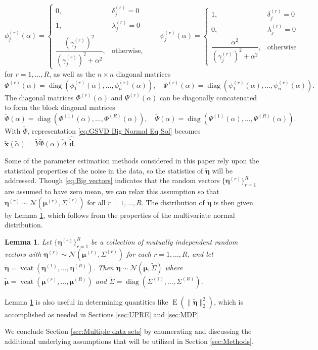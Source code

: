 \documentclass[12pt]{article}
\newcommand{\dVec}{\mathbf{d}}	%
\newcommand{\xVec}{\mathbf{x}}	%
\newcommand{\pinv}[1]{{#1}^\dagger}	%
\DeclareMathOperator{\diag}{diag}	%
\DeclareMathOperator{\vcat}{vcat}	%
\newcommand{\regparam}{\alpha}  %
\newcommand{\regparamBig}{\widetilde{\regparam}}   %
\newcommand{\xBig}{\widetilde{\xVec}}	%
\newcommand{\dBig}{\widetilde{\dVec}}	%
\newcommand{\filt}{\phi}
\newcommand{\mfilt}{\psi}
\newcommand{\noise}{\eta}	%
\newcommand{\noiseVec}{\bm{\noise}}	%
\DeclareMathOperator{\E}{E}	%
\newcommand{\svd}[1]{\widehat{#1}}	%
\newtheorem{lemma}{Lemma}[section]
\begin{document}
\[\filt_j^{(r)}\left(\regparam\right) = \begin{cases}
0, & \delta_j^{(r)} = 0 \\
1, & \lambda_j^{(r)} = 0 \\
\dfrac{\left(\gamma_j^{(r)}\right)^2}{\left(\gamma_j^{(r)}\right)^2 + \regparam^2}, & \text{otherwise,}
\end{cases} \qquad
\mfilt_j^{(r)}\left(\regparam\right) = \begin{cases}
1, & \delta_j^{(r)} = 0 \\
0, & \lambda_j^{(r)} = 0 \\
\dfrac{\regparam^2}{\left(\gamma_j^{(r)}\right)^2 + \regparam^2}, & \text{otherwise}
\end{cases}\]
for $r = 1,\ldots,R$, as well as the $n \times n$ diagonal matrices
\[\Phi^{(r)}(\regparam) = \diag\left(\filt_1^{(r)}(\regparam),\ldots,\filt_n^{(r)}(\regparam)\right), \quad \Psi^{(r)}(\regparam) = \diag\left(\mfilt_1^{(r)}(\regparam),\ldots,\mfilt_n^{(r)}(\regparam)\right).\]
The diagonal matrices $\Phi^{(r)}(\regparam)$ and $\Psi^{(r)}(\regparam)$ can be diagonally concatenated to form the block diagonal matrices
\[\widetilde{\Phi}(\regparam) = \diag\left(\Phi^{(1)}(\regparam),\ldots,\Phi^{(R)}(\regparam)\right), \quad \widetilde{\Psi}(\regparam) = \diag\left(\Psi^{(1)}(\regparam),\ldots,\Psi^{(R)}(\regparam)\right).\]
With $\widetilde{\Phi}$, representation \eqref{eq:GSVD Big Normal Eq Sol} becomes $\xBig(\regparamBig) = \widetilde{Y}\widetilde{\Phi}(\regparam)\pinv{\widetilde{\Delta}}\svd{\dBig}$.

Some of the parameter estimation methods considered in this paper rely upon the statistical properties of the noise in the data, so the statistics of $\widetilde{\noiseVec}$ will be addressed. Though \eqref{eq:Big vectors} indicates that the random vectors $\{\noiseVec^{(r)}\}_{r=1}^R$ are assumed to have zero mean, we can relax this assumption so that $\noiseVec^{(r)} \sim \mathcal{N}(\bm{\mu}^{(r)},\Sigma^{(r)})$ for all $r = 1,\ldots,R$. The distribution of $\widetilde{\noiseVec}$ is then given by Lemma \ref{lem:Concatenation of Normal Noise}, which follows from the properties of the multivariate normal distribution. 
\begin{lemma}
\label{lem:Concatenation of Normal Noise}
Let $\{\noiseVec^{(r)}\}_{r=1}^R$ be a collection of mutually independent random vectors with $\noiseVec^{(r)} \sim \mathcal{N}(\bm{\mu}^{(r)},\Sigma^{(r)})$ for each $r = 1,\ldots,R$, and let $\widetilde{\noiseVec} = \vcat(\noiseVec^{(1)},\ldots,\noiseVec^{(R)})$. Then $\widetilde{\noiseVec} \sim \mathcal{N}(\widetilde{\bm{\mu}},\widetilde{\Sigma})$ where $\widetilde{\bm{\mu}} = \vcat(\bm{\mu}^{(r)},\ldots,\bm{\mu}^{(R)})$ and $\widetilde{\Sigma} = \diag(\Sigma^{(1)},\ldots,\Sigma^{(R)})$.
\end{lemma}
\noindent Lemma \ref{lem:Concatenation of Normal Noise} is also useful in determining quantities like $\E(\|\widetilde{\noiseVec}\|_2^2)$, which is accomplished as needed in Sections \ref{sec:UPRE} and \ref{sec:MDP}. \par
We conclude Section \ref{sec:Multiple data sets} by enumerating and discussing the additional underlying assumptions that will be utilized in Section \ref{sec:Methods}.
\end{document}
